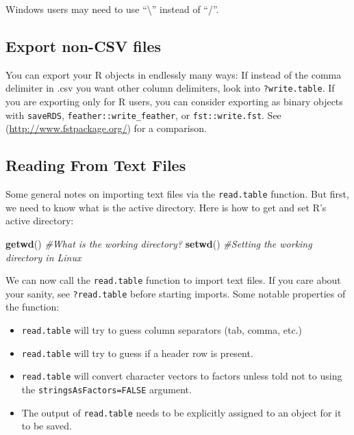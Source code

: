 \documentclass[]{book}
\newenvironment{Shaded}{\begin{snugshade}}{\end{snugshade}}
\newcommand{\CommentTok}[1]{\textcolor[rgb]{0.56,0.35,0.01}{\textit{#1}}}
\newcommand{\KeywordTok}[1]{\textcolor[rgb]{0.13,0.29,0.53}{\textbf{#1}}}
\newcommand{\NormalTok}[1]{#1}
\providecommand{\tightlist}{%
  \setlength{\itemsep}{0pt}\setlength{\parskip}{0pt}}
\theoremstyle{definition}
\theoremstyle{definition}
\theoremstyle{definition}
\theoremstyle{remark}
\let\BeginKnitrBlock\begin \let\EndKnitrBlock\end
\begin{document}
\BeginKnitrBlock{remark}
{}Windows users may need to use ``\textbackslash{}'' instead of ``/''.
\EndKnitrBlock{remark}

\hypertarget{export-non-csv-files}{%
\subsection{Export non-CSV files}\label{export-non-csv-files}}

You can export your R objects in endlessly many ways:
If instead of the comma delimiter in .csv you want other column delimiters, look into \texttt{?write.table}.
If you are exporting only for R users, you can consider exporting as binary objects with \texttt{saveRDS}, \texttt{feather::write\_feather}, or \texttt{fst::write.fst}.
See (\url{http://www.fstpackage.org/}) for a comparison.

\hypertarget{reading-from-text-files}{%
\subsection{Reading From Text Files}\label{reading-from-text-files}}

Some general notes on importing text files via the \texttt{read.table} function.
But first, we need to know what is the active directory.
Here is how to get and set R's active directory:

\begin{Shaded}
\begin{Highlighting}[]
\KeywordTok{getwd}\NormalTok{() }\CommentTok{#What is the working directory?}
\KeywordTok{setwd}\NormalTok{() }\CommentTok{#Setting the working directory in Linux}
\end{Highlighting}
\end{Shaded}

We can now call the \texttt{read.table} function to import text files.
If you care about your sanity, see \texttt{?read.table} before starting imports.
Some notable properties of the function:

\begin{itemize}
\tightlist
\item
  \texttt{read.table} will try to guess column separators (tab, comma, etc.)
\item
  \texttt{read.table} will try to guess if a header row is present.
\item
  \texttt{read.table} will convert character vectors to factors unless told not to using the \texttt{stringsAsFactors=FALSE} argument.
\item
  The output of \texttt{read.table} needs to be explicitly assigned to an object for it to be saved.
\end{itemize}
\end{document}
